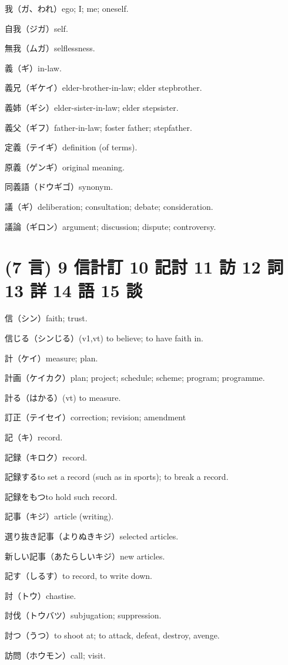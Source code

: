 我（ガ、われ）ego; I; me; oneself.

自我（ジガ）self.

無我（ムガ）selflessness.

義（ギ）in-law.

義兄（ギケイ）elder-brother-in-law; elder stepbrother.

義姉（ギシ）elder-sister-in-law; elder stepsister.

義父（ギフ）father-in-law; foster father; stepfather.

定義（テイギ）definition (of terms).

原義（ゲンギ）original meaning.

同義語（ドウギゴ）synonym.

議（ギ）deliberation; consultation; debate; consideration.

議論（ギロン）argument; discussion; dispute; controversy.

\section{(7 言) 9 信計訂 10 記討 11 訪 12 詞 13 詳 14 語 15 談}

信（シン）faith; trust.

信じる（シンじる）(v1,vt) to believe; to have faith in.

計（ケイ）measure; plan.

計画（ケイカク）plan; project; schedule; scheme; program; programme.

計る（はかる）(vt) to measure.

訂正（テイセイ）correction; revision; amendment

記（キ）record.

記録（キロク）record.

記録するto set a record (such as in sports); to break a record.

記録をもつto hold such record.

記事（キジ）article (writing).

選り抜き記事（よりぬきキジ）selected articles.

新しい記事（あたらしいキジ）new articles.

記す（しるす）to record, to write down.

討（トウ）chastise.

討伐（トウバツ）subjugation; suppression.

討つ（うつ）to shoot at; to attack, defeat, destroy, avenge.

訪問（ホウモン）call; visit.

